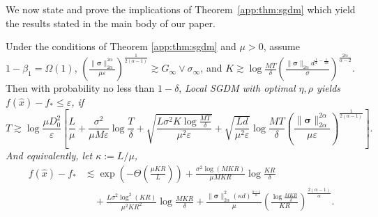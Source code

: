 \documentclass{article} %
\numberwithin{equation}{section}
\begin{document}
We now state and prove the implications of Theorem~\ref{app:thm:sgdm} which yield the results stated in the main body of our paper.
\begin{thm}\label{app:thm:sgdm_sc}
    Under the conditions of Theorem \ref{app:thm:sgdm} and $\mu>0$, assume $1-\beta_1=\Omega(1)$, $\left(\frac{\|\boldsymbol{\sigma}\|_{2\alpha}^{2\alpha}}{\mu\varepsilon}\right)^{\frac{1}{2(\alpha-1)}}\gtrsim G_\infty\vee \sigma_\infty$, and $K\gtrsim \log\frac{MT}{\delta}\left(\frac{\|\boldsymbol{\sigma}\|_{2\alpha}d^{\frac{1}{2}-\frac{1}{2\alpha}}}{\sigma}\right)^{\frac{2\alpha}{\alpha-2}}$. Then with probability no less than $1-\delta$, \em Local \em SGDM with optimal $\eta, \rho$ yields $f(\hat{x})-f_*\leq \varepsilon$, if
    \begin{equation}
        T\gtrsim 
        \log\frac{\mu D_0^2}{\varepsilon}\left[\frac{L}{\mu}+\frac{\sigma^2}{\mu M \varepsilon}\log\frac{T}{\delta}+\sqrt{\frac{L\sigma^2K\log\frac{MT}{\delta}}{\mu^2\varepsilon}}+\sqrt{\frac{Ld}{\mu^2\varepsilon}}\log\frac{MT}{\delta}\left(\frac{\|\boldsymbol{\sigma}\|_{2\alpha}^{2\alpha}}{\mu\varepsilon}\right)^{\frac{1}{2(\alpha-1)}}\right].
    \end{equation}
    And equivalently, let $\kappa:=L/\mu$,
    \begin{equation}
        \begin{aligned}
            f(\hat{x})-f_*
            &\lesssim \exp\left(-\Theta\left(\frac{\mu KR}{L}\right)\right) + \frac{\sigma^2\log(MKR)}{\mu MKR}\log\frac{KR}{\delta} \\
            &\quad + \frac{L\sigma^2\log^2(KR)}{\mu^2KR^2}\log\frac{MKR}{\delta} + \frac{\|\boldsymbol{\sigma}\|_{2\alpha}^2(\kappa d)^{\frac{\alpha-1}{\alpha}}}{\mu} \left(\frac{\log\frac{MKR}{\delta}}{KR}\right)^{\frac{2(\alpha-1)}{\alpha}}.
        \end{aligned}
    \end{equation}
\end{thm}
\end{document}

